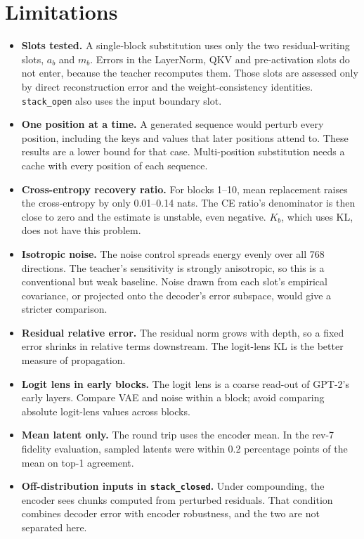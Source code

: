 \documentclass[11pt]{article}
\begin{document}
\section{Limitations}
\label{sec:limits}

\begin{itemize}
  \item \textbf{Slots tested.} A single-block substitution uses only the two residual-writing slots, $a_b$ and $m_b$.
    Errors in the LayerNorm, QKV and pre-activation slots do not enter, because the teacher recomputes them. Those slots
    are assessed only by direct reconstruction error and the weight-consistency identities. \texttt{stack\_open} also
    uses the input boundary slot.
  \item \textbf{One position at a time.} A generated sequence would perturb every position, including the keys and
    values that later positions attend to. These results are a lower bound for that case. Multi-position substitution
    needs a cache with every position of each sequence.
  \item \textbf{Cross-entropy recovery ratio.} For blocks 1--10, mean replacement raises the cross-entropy by only
    0.01--0.14 nats. The CE ratio's denominator is then close to zero and the estimate is unstable, even negative.
    $K_b$, which uses KL, does not have this problem.
  \item \textbf{Isotropic noise.} The noise control spreads energy evenly over all 768 directions. The teacher's
    sensitivity is strongly anisotropic, so this is a conventional but weak baseline. Noise drawn from each slot's
    empirical covariance, or projected onto the decoder's error subspace, would give a stricter comparison.
  \item \textbf{Residual relative error.} The residual norm grows with depth, so a fixed error shrinks in relative terms
    downstream. The logit-lens KL is the better measure of propagation.
  \item \textbf{Logit lens in early blocks.} The logit lens is a coarse read-out of GPT-2's early layers. Compare VAE and
    noise within a block; avoid comparing absolute logit-lens values across blocks.
  \item \textbf{Mean latent only.} The round trip uses the encoder mean. In the rev-7 fidelity evaluation, sampled
    latents were within 0.2 percentage points of the mean on top-1 agreement.
  \item \textbf{Off-distribution inputs in \texttt{stack\_closed}.} Under compounding, the encoder sees chunks computed
    from perturbed residuals. That condition combines decoder error with encoder robustness, and the two are not
    separated here.
\end{itemize}
\end{document}
